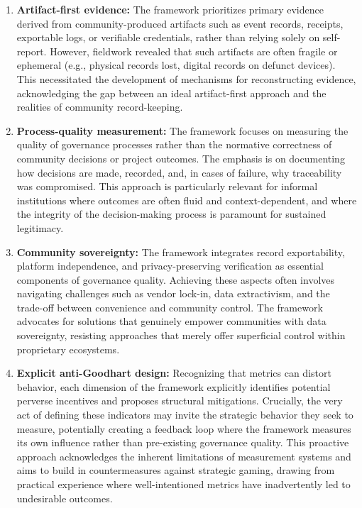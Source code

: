 \documentclass[sigconf,anonymous]{acmart}
\begin{document}
\begin{enumerate}
\item \textbf{Artifact-first evidence:} The framework prioritizes primary evidence derived from community-produced artifacts such as event records, receipts, exportable logs, or verifiable credentials, rather than relying solely on self-report. However, fieldwork revealed that such artifacts are often fragile or ephemeral (e.g., physical records lost, digital records on defunct devices). This necessitated the development of mechanisms for reconstructing evidence, acknowledging the gap between an ideal artifact-first approach and the realities of community record-keeping.
\item \textbf{Process-quality measurement:} The framework focuses on measuring the quality of governance processes rather than the normative correctness of community decisions or project outcomes. The emphasis is on documenting how decisions are made, recorded, and, in cases of failure, why traceability was compromised. This approach is particularly relevant for informal institutions where outcomes are often fluid and context-dependent, and where the integrity of the decision-making process is paramount for sustained legitimacy.
\item \textbf{Community sovereignty:} The framework integrates record exportability, platform independence, and privacy-preserving verification as essential components of governance quality. Achieving these aspects often involves navigating challenges such as vendor lock-in, data extractivism, and the trade-off between convenience and community control. The framework advocates for solutions that genuinely empower communities with data sovereignty, resisting approaches that merely offer superficial control within proprietary ecosystems.
\item \textbf{Explicit anti-Goodhart design:} Recognizing that metrics can distort behavior, each dimension of the framework explicitly identifies potential perverse incentives and proposes structural mitigations. Crucially, the very act of defining these indicators may invite the strategic behavior they seek to measure, potentially creating a feedback loop where the framework measures its own influence rather than pre-existing governance quality. This proactive approach acknowledges the inherent limitations of measurement systems and aims to build in countermeasures against strategic gaming, drawing from practical experience where well-intentioned metrics have inadvertently led to undesirable outcomes.
\end{enumerate}
\end{document}
